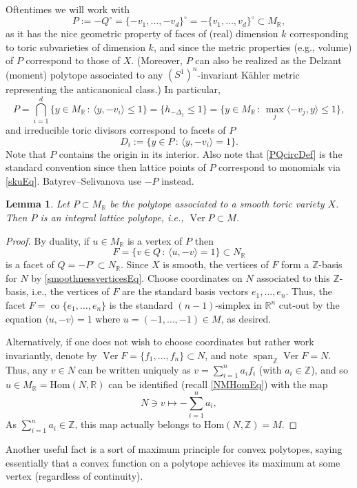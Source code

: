 \documentclass{article}
\newcommand{\RR}{{\mathbb R}}
\newcommand{\ZZ}{{\mathbb Z}}
\renewcommand{\>}{\rightarrow}
\DeclareMathOperator{\Ver}{Ver}
\DeclareMathOperator{\Conv}{co}
\DeclareMathOperator{\Span}{span}
\theoremstyle{plain}
\newtheorem{lemma}[theorem]{Lemma}
\theoremstyle{definition}
\def\K{K\"ahler }
\newcommand{\beq}{\begin{equation}}
\newcommand{\eeq}{\end{equation}}
\newcommand{\bpf}{\begin{proof}}
\newcommand{\epf}{\end{proof}}
\newcommand{\blem}{\begin{lemma}}
\newcommand{\elem}{\end{lemma}}
\def\lb#1{\label{#1}}
\begin{document}
Oftentimes we will work with 
\beq
\lb{PQcircDef}
P:=-Q^\circ
=
\{-v_1,\ldots,-v_d\}^\circ=
-\{v_1,\ldots,v_d\}^\circ
\subset M_\RR,
\eeq
as it has the nice geometric property of faces of (real) dimension $k$ 
corresponding to toric subvarieties of dimension $k$,
and since the metric properties (e.g., volume) 
of $P$ correspond to those of $X$. (Moreover, $P$ can also be realized as 
the Delzant (moment) polytope associated to any $(S^1)^n$-invariant \K metric
representing the anticanonical class.) 
In particular,
\beq
\lb{PDef2Eq}
P=\bigcap_{i=1}^d\Big\{y\in M_\RR\,:\, \langle y, -v_i\rangle \le 1\Big\}
=\{h_{-\Delta_1}\le 1\}=\{y\in M_\RR\,:\, \max_j\langle -v_j,y\rangle\le1\},
\eeq
and
irreducible toric divisors correspond to facets of $P$
\beq
\lb{toricDiEq}
D_i:=\{y\in P\,:\, \langle y, -v_i\rangle = 1\}.
\eeq
Note that $P$ contains the origin in its interior.
Also note that \eqref{PQcircDef} is the standard convention since
then lattice points of $P$ correspond to monomials via \eqref{skuEq}.
Batyrev--Selivanova use $-P$ instead.

\blem
\lb{PIntegralLem}
Let $P\subset M_\RR$ be the polytope associated to a smooth toric variety $X$. Then $P$ is an integral lattice polytope, i.e., $\Ver P\subset M$.
\elem
\bpf
By duality, if $u\in M_\RR$ is a vertex of $P$ 
then 
\beq
\lb{FQverPEq}
F=\{v\in Q\,:\,\langle u,-v\rangle=1\}\subset N_\RR
\eeq
is a facet of $Q=-P^\circ\subset N_\RR$.
Since $X$ is smooth, the vertices of $F$ form a $\ZZ$-basis for $N$ 
by \eqref{smoothnessverticesEq}.
Choose coordinates on $N$ associated to this $\ZZ$-basis, i.e., the vertices of $F$ are the standard basis vectors $e_1,\ldots,e_n$. 
Thus, the facet $F=\Conv\{e_1,\ldots,e_n\}$ is the standard $(n-1)$-simplex in $\RR^n$
cut-out by the equation $\langle u,-v\rangle=1$ where $u=(-1,\ldots,-1)\in M$,
as desired.

Alternatively, if one does not wish to choose coordinates but rather
work invariantly, denote by $\Ver F=\{f_1,\ldots,f_n\}\subset N$,
and note $\Span_{\ZZ}\Ver F=N$. 
Thus, any 
$v\in N$ can be written uniquely as $v=\sum_{i=1}^na_if_i$ (with $a_i\in\ZZ$),
and so $u\in M_\RR=\mathrm{Hom}(N,\RR)$ can
be identified (recall \eqref{NMHomEq}) with the map
$$
N\ni v\mapsto -\sum_{i=1}^na_i,
$$
As $\sum_{i=1}^na_i\in \ZZ$, this map actually belongs to 
$\mathrm{Hom}(N,\ZZ)=M$.
\epf

Another useful fact is a sort of maximum principle for convex polytopes,
saying essentially that a convex function on a polytope achieves its maximum at some vertex (regardless of continuity).
\end{document}

